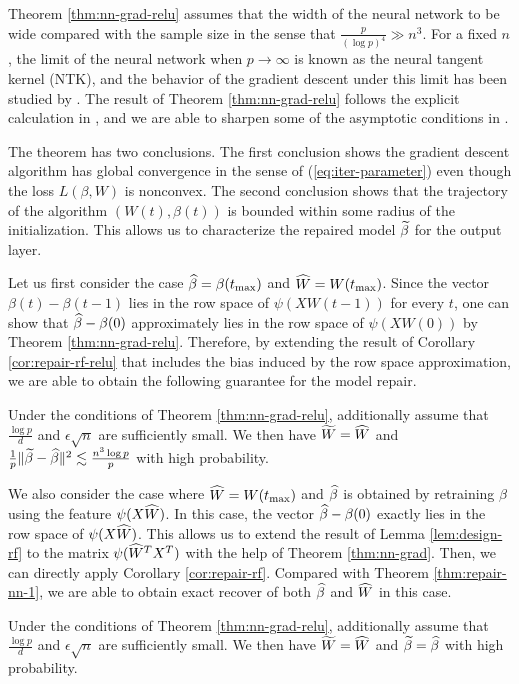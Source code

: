 Theorem \ref{thm:nn-grad-relu} assumes that the width of the neural network to be wide compared with the sample size in the sense that $\frac{p}{(\log p)^4}\gg n^3$. For a fixed $n$, the limit of the neural network when $p\rightarrow\infty$ is known as the neural tangent kernel (NTK), and the behavior of the gradient descent under this limit has been studied by \cite{jacot2018neural}. The result of Theorem \ref{thm:nn-grad-relu} follows the explicit calculation in \cite{du2018gradient}, and we are able to sharpen some of the asymptotic conditions in \cite{du2018gradient}.

The theorem has two conclusions. The first conclusion shows the gradient descent algorithm has global convergence in the sense of (\ref{eq:iter-parameter}) even though the loss $L(\beta,W)$ is nonconvex. The second conclusion shows that the trajectory of the algorithm $(W(t),\beta(t))$ is bounded within some radius of the initialization. This allows us to characterize the repaired model $\widetilde{\beta}$ for the output layer.

Let us first consider the case $\widehat{\beta}=\beta(t_{\max})$ and $\widehat{W}=W(t_{\max})$. Since the vector $\beta(t)-\beta(t-1)$ lies in the row space of $\psi(XW(t-1))$ for every $t$, one can show that $\widehat{\beta}-\beta(0)$ approximately lies in the row space of $\psi(XW(0))$ by Theorem \ref{thm:nn-grad-relu}. Therefore, by extending the result of Corollary \ref{cor:repair-rf-relu} that includes the bias induced by the row space approximation, we are able to obtain the following guarantee for the model repair.
\begin{thm}\label{thm:repair-nn-1-relu}
Under the conditions of Theorem \ref{thm:nn-grad-relu}, additionally assume that $\frac{\log p}{d}$ and $\epsilon\sqrt{n}$ are sufficiently small. We then have $\widetilde{W}=\widehat{W}$ and $\frac{1}{p}\|\widetilde{\beta}-\widehat{\beta}\|^2 \lesssim \frac{n^3\log p}{p}$ with high probability.
\end{thm}


We also consider the case where $\widehat{W}=W(t_{\max})$ and $\widehat{\beta}$ is obtained by retraining $\beta$ using the feature $\psi(X\widehat{W})$. In this case, the vector $\widehat{\beta}-\beta(0)$ exactly lies in the row space of $\psi(X\widehat{W})$. This allows us to extend the result of Lemma \ref{lem:design-rf} to the matrix $\psi(\widehat{W}^TX^T)$ with the help of Theorem \ref{thm:nn-grad}. Then, we can directly apply Corollary \ref{cor:repair-rf}. Compared with Theorem \ref{thm:repair-nn-1}, we are able to obtain exact recover of both $\widehat{\beta}$ and $\widehat{W}$ in this case.
\begin{thm}\label{thm:repair-nn-2-relu}
Under the conditions of Theorem \ref{thm:nn-grad-relu}, additionally assume that $\frac{\log p}{d}$ and $\epsilon\sqrt{n}$ are sufficiently small. We then have $\widetilde{W}=\widehat{W}$ and $\widetilde{\beta}=\widehat{\beta}$ with high probability.
\end{thm}


